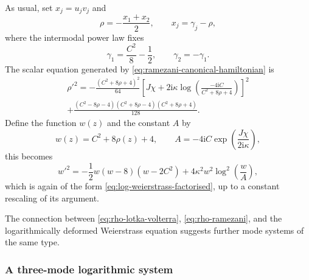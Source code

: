 \documentclass[11pt,a4paper]{article}
\numberwithin{equation}{section}
\begin{document}
As usual, set $x_j=u_jv_j$ and
\begin{equation}
    \rho=-\frac{x_1+x_2}{2},
    \qquad
    x_j=\gamma_j-\rho,
\end{equation}
where the intermodal power law fixes
\begin{equation}
    \gamma_1=\frac{C^2}{8}-\frac{1}{2},
    \qquad
    \gamma_2=-\gamma_1.
\end{equation}
The scalar equation generated by \eqref{eq:ramezani-canonical-hamiltonian} is
\begin{multline}
    \rho'^2
    =
    -\frac{(C^2+8\rho+4)^2}{64}
    \left[
        J\chi+2\mathrm{i}\kappa
        \log\left(\frac{-4\mathrm{i}C}{C^2+8\rho+4}\right)
    \right]^2
    \\
    +
    \frac{(C^2-8\rho-4)(C^2+8\rho-4)(C^2+8\rho+4)}{128}.
    \label{eq:rho-ramezani}
\end{multline}
Define the function $w(z)$ and the constant $A$ by
\begin{equation}
    w(z)=C^2+8\rho(z)+4,
    \qquad
    A=-4\mathrm{i}C\exp\left(\frac{J\chi}{2\mathrm{i}\kappa}\right),
\end{equation}
this becomes
\begin{equation}
    w'^2
    =
    -\frac{1}{2}w(w-8)(w-2C^2)
    +
    4\kappa^2w^2\log^2\left(\frac{w}{A}\right), \label{eq:ramezani-log-weierstrass}
\end{equation}
which is again of the form \eqref{eq:log-weierstrass-factorised}, up to a constant rescaling of its argument.

The connection between \eqref{eq:rho-lotka-volterra}, \eqref{eq:rho-ramezani}, and the logarithmically deformed Weierstrass equation suggests further mode systems of the same type.

\subsubsection{A three-mode logarithmic system}
\end{document}

